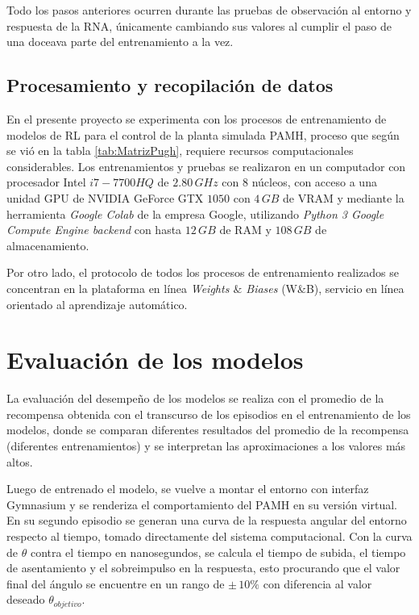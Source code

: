 Todo los pasos anteriores ocurren durante las pruebas de observación al entorno y respuesta de la RNA, únicamente cambiando sus valores al cumplir el paso de una doceava parte del entrenamiento a la vez.


\subsection{Procesamiento y recopilación de datos}

En el presente proyecto se experimenta con los procesos de entrenamiento de modelos de RL para el control de la planta simulada PAMH, proceso que según se vió en la tabla \ref{tab:MatrizPugh}, requiere recursos computacionales considerables. Los entrenamientos y pruebas se realizaron en un computador con procesador Intel $i7-7700HQ$ de $2.80\, GHz$ con $8$ núcleos, con acceso a una unidad GPU de NVIDIA GeForce GTX $1050$ con $4\, GB$ de VRAM y mediante la herramienta \textit{Google Colab} de la empresa Google, utilizando \textit{Python 3 Google Compute Engine backend} con hasta $12\, GB$ de RAM y $108\, GB$ de almacenamiento.

Por otro lado, el protocolo de todos los procesos de entrenamiento realizados se concentran en la plataforma en línea \textit{Weights $\&$ Biases} (W$\&$B), servicio en línea orientado al aprendizaje automático.



\section{Evaluación de los modelos}

La evaluación del desempeño de los modelos se realiza con el promedio de la recompensa obtenida con el transcurso de los episodios en el entrenamiento de los modelos, donde se comparan diferentes resultados del promedio de la recompensa (diferentes entrenamientos) y se interpretan las aproximaciones a los valores más altos.

Luego de entrenado el modelo, se vuelve a montar el entorno con interfaz Gymnasium y se renderiza el comportamiento del PAMH en su versión virtual. En su segundo episodio se generan una curva de la respuesta angular del entorno respecto al tiempo, tomado directamente del sistema computacional. Con la curva de $\theta$ contra el tiempo en nanosegundos, se calcula el tiempo de subida, el tiempo de asentamiento y el sobreimpulso en la respuesta, esto procurando que el valor final del ángulo se encuentre en un rango de $\pm \, 10\%$ con diferencia al valor deseado $\theta_{objetivo}$.


